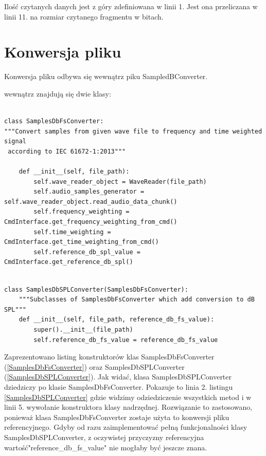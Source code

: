 \documentclass[eng,printmode]{mgr}
\begin{document}
Ilość czytanych danych jest z góry zdefiniowana w linii 1. Jest ona przeliczana w linii 11. na rozmiar czytanego fragmentu w bitach. 

\section{Konwersja pliku}
Konwersja pliku odbywa się wewnątrz piku SampledBConverter. 

wewnątrz znajdują się dwie klasy:

\begin{minipage}{\linewidth}
\begin{lstlisting}[caption={fragment kodu źródłowego pliku SampledBConverter.py,\newline klasa SamplesDbFSConverter},captionpos=b,label={SamplesDbFsConverter}]

class SamplesDbFsConverter:
"""Convert samples from given wave file to frequency and time weighted signal
 according to IEC 61672-1:2013"""

    def __init__(self, file_path):
        self.wave_reader_object = WaveReader(file_path)
        self.audio_samples_generator = self.wave_reader_object.read_audio_data_chunk()
        self.frequency_weighting = CmdInterface.get_frequency_weighting_from_cmd()
        self.time_weighting = CmdInterface.get_time_weighting_from_cmd()
        self.reference_db_spl_value = CmdInterface.get_reference_db_spl()
\end{lstlisting}
\end{minipage}

\begin{minipage}{\linewidth}
\begin{lstlisting}[caption={fragment kodu źródłowego pliku SampledBConverter.py,\newline klasa SamplesDbSPLConverter},captionpos=b,label={SamplesDbSPLConverter}]

class SamplesDbSPLConverter(SamplesDbFsConverter):
    """Subclasses of SamplesDbFsConverter which add conversion to dB SPL"""
    def __init__(self, file_path, reference_db_fs_value):
        super().__init__(file_path)
        self.reference_db_fs_value = reference_db_fs_value

\end{lstlisting}
\end{minipage}

Zaprezentowano listing konstruktorów klas SamplesDbFsConverter (\ref{SamplesDbFsConverter}) oraz  SamplesDbSPLConverter (\ref{SamplesDbSPLConverter}). Jak widać, klasa SamplesDbSPLConverter dziedziczy po klasie SamplesDbFsConverter. Pokazuje to linia 2. listingu \ref{SamplesDbSPLConverter} gdzie widzimy odziedziczenie wszystkich metod i w linii 5. wywołanie konstruktora klasy nadrzędnej. Rozwiązanie to zastosowano, ponieważ klasa SamplesDbFsConverter zostaje użyta to konwersji pliku referencyjnego. Gdyby od razu zaimplementować pełną funkcjonalności klasy SamplesDbSPLConverter, z oczywistej przyczyzny referencyjna wartość\newline "reference\_db\_fs\_value" nie mogłaby być jeszcze znana. 
\end{document}
